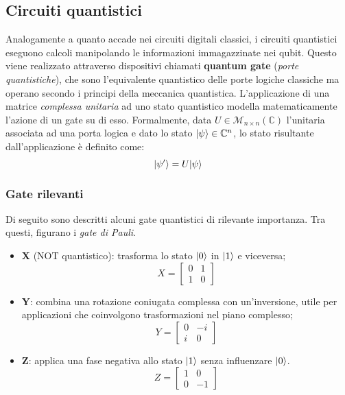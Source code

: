 
\subsection{Circuiti quantistici}

Analogamente a quanto accade nei circuiti digitali classici, i circuiti
quantistici eseguono calcoli manipolando le informazioni immagazzinate nei
qubit. Questo viene realizzato attraverso dispositivi chiamati \textbf{quantum
gate} (\emph{porte quantistiche}), che sono l'equivalente quantistico delle porte logiche classiche
ma operano secondo i principi della meccanica quantistica. L'applicazione di una
matrice \emph{complessa unitaria} ad uno stato quantistico modella matematicamente l'azione di un
gate su di esso. Formalmente, data $U \in \mathcal{M}_{n \times n}(\mathbb{C})$
l'unitaria associata ad una porta logica e dato lo stato $\lvert\psi\rangle \in
\mathbb{C}^n$, lo stato risultante dall'applicazione è definito come:
\begin{equation}
	\lvert\psi'\rangle = U\lvert\psi\rangle
	\label{eq:gate-res-state}
\end{equation}

\subsubsection*{Gate rilevanti}

Di seguito sono descritti alcuni gate quantistici di rilevante importanza. Tra
questi, figurano i \emph{gate di Pauli}.
\begin{itemize}
	\item \textbf{X} (NOT quantistico): trasforma lo stato $\lvert0\rangle$ in $\lvert1\rangle$
	e viceversa;
	\[
		X =\begin{bmatrix}
			0 & 1\\
			1 & 0
		\end{bmatrix}
	\]
	\item \textbf{Y}: combina una rotazione coniugata complessa con un'inversione, utile per applicazioni che coinvolgono trasformazioni nel piano complesso;
	\[
		Y =\begin{bmatrix}
			0 & -i\\
			i & 0
		\end{bmatrix}
	\]
	\item \textbf{Z}: applica una fase negativa allo stato $\lvert1\rangle$ senza influenzare $\lvert0\rangle$.
	\[
		Z =\begin{bmatrix}
			1 & 0\\
			0 & -1
		\end{bmatrix}
	\]
\end{itemize}


